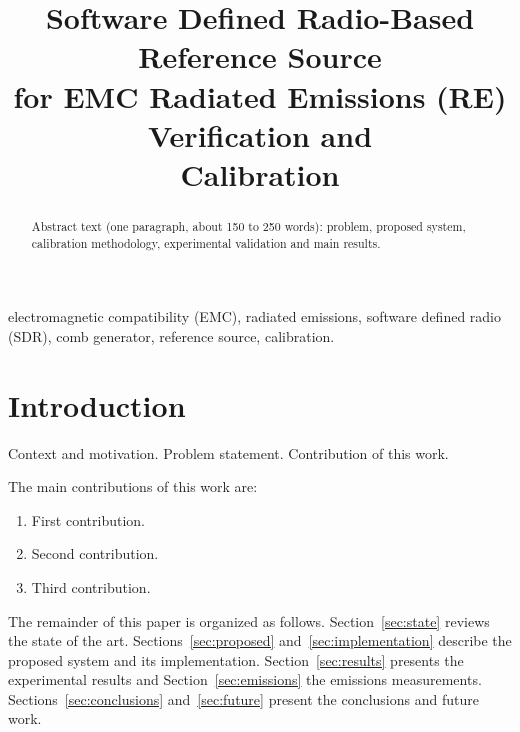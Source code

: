 \documentclass[conference]{IEEEtran}
\begin{document}
\title{Software Defined Radio-Based Reference Source\\
for EMC Radiated Emissions (RE) Verification and\\
Calibration}

\author{
}

\maketitle

\begin{abstract}
Abstract text (one paragraph, about 150 to 250 words): problem, proposed system, calibration methodology, experimental validation and main results.
\end{abstract}

\begin{IEEEkeywords}
electromagnetic compatibility (EMC), radiated emissions, software defined radio (SDR), comb generator, reference source, calibration.
\end{IEEEkeywords}

\section{Introduction}

Context and motivation. Problem statement. Contribution of this work.

The main contributions of this work are:
\begin{enumerate}
  \item First contribution.
  \item Second contribution.
  \item Third contribution.
\end{enumerate}

The remainder of this paper is organized as follows. Section~\ref{sec:state} reviews the state of the art. Sections~\ref{sec:proposed} and~\ref{sec:implementation} describe the proposed system and its implementation. Section~\ref{sec:results} presents the experimental results and Section~\ref{sec:emissions} the emissions measurements. Sections~\ref{sec:conclusions} and~\ref{sec:future} present the conclusions and future work.
\end{document}
